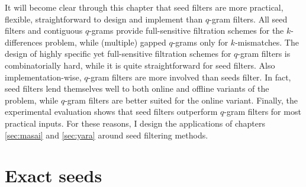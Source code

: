 It will become clear through this chapter that seed filters are more practical, flexible, straightforward to design and implement than $q$-gram filters.
All seed filters and contiguous $q$-grams provide full-sensitive filtration schemes for the $k$-differences problem, while (multiple) gapped $q$-grams only for $k$-mismatches.
The design of highly specific yet full-sensitive filtration schemes for $q$-gram filters is combinatorially hard, while it is quite straightforward for seed filters.
Also implementation-wise, $q$-gram filters are more involved than seeds filter.
In fact, seed filters lend themselves well to both online and offline variants of the problem, while $q$-gram filters are better suited for the online variant.
Finally, the experimental evaluation shows that seed filters outperform $q$-gram filters for most practical inputs.
For these reasons, I design the applications of chapters \ref{sec:masai} and \ref{sec:yara} around seed filtering methods.





\section{Exact seeds}
\label{sec:filtering:exact}

